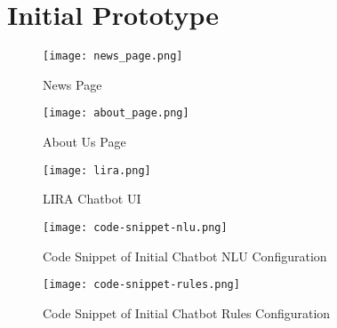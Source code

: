 %
%
%                 

\chapter{Initial Prototype}
\label{sec:appendixa}

\begin{figure}[h]
	\centering 
	\texttt{[image: news\_page.png]}
	\caption{News Page}
	\label{fig:news_page}
\end{figure}

\begin{figure}[h]
	\centering 
	\texttt{[image: about\_page.png]}
	\caption{About Us Page}
	\label{fig:anout_page}
\end{figure}

\newpage

\begin{figure}[h]
	\centering 
	\texttt{[image: lira.png]}
	\caption{LIRA Chatbot UI}
	\label{fig:LIRA}
\end{figure}

\newpage

\begin{figure}[h]
	\centering 
	\texttt{[image: code-snippet-nlu.png]}
	\caption{Code Snippet of Initial Chatbot NLU Configuration}
\end{figure}

\begin{figure}[h]
	\centering 
	\texttt{[image: code-snippet-rules.png]}
	\caption{Code Snippet of Initial Chatbot Rules Configuration}
\end{figure}


%

